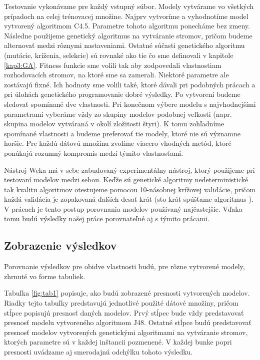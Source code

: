 Testovanie vykonávame pre každý vstupný súbor. Modely vytvárame vo všetkých prípadoch na celej trénovacej množine. Najprv vytvoríme a vyhodnotíme model vytvorený algoritmom C4.5. Parametre tohoto algoritmu ponecháme bez zmeny. Následne použijeme genetický algoritmus na vytváranie stromov, pričom budeme alternovať medzi rôznymi nastaveniami. Ostatné súčasti genetického algoritmu (mutácie, kríženia, selekcie) sú rovnaké ako tie čo sme definovali v kapitole \ref{kap3:GA}. Fitness funkcie sme volili tak aby zodpovedali vlastnostiam rozhodovacích stromov, na ktoré sme sa zamerali. Niektoré parametre ale zostávajú fixné. Ich hodnoty sme volili také, ktoré dávali pri podobných prácach a pri úlohách genetického programovanie dobré výsledky. Po vytvorení budeme sledovať spomínané dve vlastnosti. Pri konečnom výbere modelu s najvhodnejšími parametrami vyberáme vždy zo skupiny modelov podobnej veľkosti (napr. skupina modelov vytváraná v okolí zložitosti štyri). K tomu zohľadníme spomínané vlastnosti a budeme preferovať tie modely, ktoré nie sú významne horšie. Pre každú dátovú množinu zvolíme viacero vhodných metód, ktoré ponúkajú rozumný kompromis medzi týmito vlastnosťami.

Nástroj Weka má v sebe zabudovaný experimentálny nástroj, ktorý použijeme pri testovaní modelov medzi sebou. Keďže sú genetické algoritmy nedeterministické tak kvalitu algoritmov otestujeme pomocou 10-násobnej krížovej validácie, pričom každá validácia je zopakovaná ďalších desať krát (sto krát spúšťame algoritmus ). V prácach je tento postup porovnania modelov používaný najčastejšie. Vďaka tomu budú výsledky našej práce porovnateľné aj s týmito prácami.

\subsection{Zobrazenie výsledkov}
Porovnanie výsledkov pre obidve vlastnosti budú, pre rôzne vytvorené modely, zhrnuté vo forme tabuliek.

Tabuľka \ref{fig:tab1} popisuje, ako budú zobrazené presnosti vytvorených modelov. Riadky tejto tabuľky predstavujú jednotlivé použité dátové množiny, pričom stĺpce popisujú presnosť daných modelov. Prvý stĺpec bude vždy predstavovať presnosť modelu vytvoreného algoritmom J48. Ostatné stĺpce budú predstavovať presnosť modelov vytvorených genetickými algoritmami na vytváranie stromov, ktorých parametre sú v každej inštancii pozmenené. V každej bunke popri presnosti uvádzame  aj smerodajnú odchýlku tohoto výsledku.

